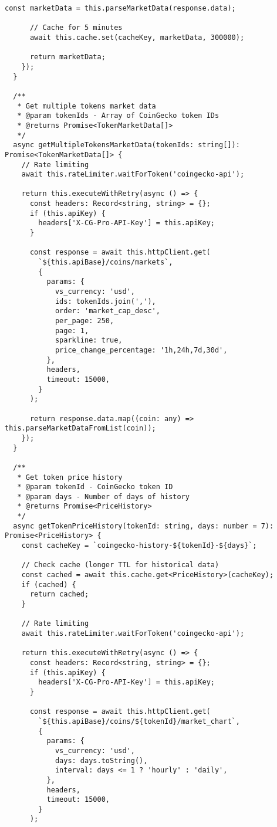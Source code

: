 \documentclass[11pt,a4paper]{article}
\begin{document}
\begin{lstlisting}[style=typescript, caption=CoinGecko Service for Market Data]
      const marketData = this.parseMarketData(response.data);
      
      // Cache for 5 minutes
      await this.cache.set(cacheKey, marketData, 300000);
      
      return marketData;
    });
  }

  /**
   * Get multiple tokens market data
   * @param tokenIds - Array of CoinGecko token IDs
   * @returns Promise<TokenMarketData[]>
   */
  async getMultipleTokensMarketData(tokenIds: string[]): Promise<TokenMarketData[]> {
    // Rate limiting
    await this.rateLimiter.waitForToken('coingecko-api');

    return this.executeWithRetry(async () => {
      const headers: Record<string, string> = {};
      if (this.apiKey) {
        headers['X-CG-Pro-API-Key'] = this.apiKey;
      }

      const response = await this.httpClient.get(
        `${this.apiBase}/coins/markets`,
        {
          params: {
            vs_currency: 'usd',
            ids: tokenIds.join(','),
            order: 'market_cap_desc',
            per_page: 250,
            page: 1,
            sparkline: true,
            price_change_percentage: '1h,24h,7d,30d',
          },
          headers,
          timeout: 15000,
        }
      );

      return response.data.map((coin: any) => this.parseMarketDataFromList(coin));
    });
  }

  /**
   * Get token price history
   * @param tokenId - CoinGecko token ID
   * @param days - Number of days of history
   * @returns Promise<PriceHistory>
   */
  async getTokenPriceHistory(tokenId: string, days: number = 7): Promise<PriceHistory> {
    const cacheKey = `coingecko-history-${tokenId}-${days}`;
    
    // Check cache (longer TTL for historical data)
    const cached = await this.cache.get<PriceHistory>(cacheKey);
    if (cached) {
      return cached;
    }

    // Rate limiting
    await this.rateLimiter.waitForToken('coingecko-api');

    return this.executeWithRetry(async () => {
      const headers: Record<string, string> = {};
      if (this.apiKey) {
        headers['X-CG-Pro-API-Key'] = this.apiKey;
      }

      const response = await this.httpClient.get(
        `${this.apiBase}/coins/${tokenId}/market_chart`,
        {
          params: {
            vs_currency: 'usd',
            days: days.toString(),
            interval: days <= 1 ? 'hourly' : 'daily',
          },
          headers,
          timeout: 15000,
        }
      );


\end{lstlisting}
\end{document}

